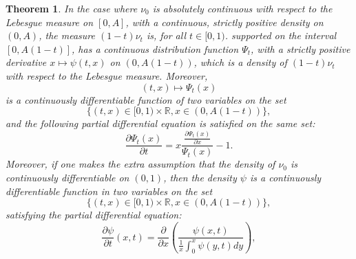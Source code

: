 \documentclass[11pt]{amsart}
\newtheorem{theorem}{Theorem}[section]
\newtheorem{remark}[theorem]{Remark}
\begin{document}
\begin{theorem}
In the case where 
$\nu_0$ is absolutely continuous with respect to the Lebesgue measure on $[0,A]$, 
with a continuous, strictly positive density 
on $(0,A)$, the measure 
$(1-t) \nu_t$ is, for all $t \in [0,1)$.  supported on the interval 
$[0, A(1-t)]$, has a continuous distribution 
function $\Psi_t$, with a strictly positive 
derivative $x \mapsto \psi(t,x)$
on $(0, A(1-t))$, which is a density of $(1-t) \nu_t$ with respect to the Lebesgue measure.  Moreover, 
$$(t, x) \mapsto \Psi_t(x)$$ is a continuously differentiable function of two variables on the set 
$$\{(t,x) \in [0,1) \times \mathbb{R}, 
x \in (0, A(1-t)) \},$$
and the following partial differential equation is satisfied on the same set: 
\begin{equation}
\label{equationPsixt}
\frac{\partial \Psi_t (x)}{\partial t} 
= x \frac{\frac{\partial \Psi_t (x)}{\partial x}  } {\Psi_t(x)} - 1. 
\end{equation}
Moreover, if one makes the extra assumption 
that the density of $\nu_0$ is continuously differentiable on $(0,1)$, then the 
density $\psi$ is a continuously 
differentiable function in two variables on 
the set 
$$\{(t,x) \in [0,1) \times \mathbb{R}, 
x \in (0, A(1-t)) \},$$
satisfying the partial differential equation: 
\begin{equation}
\frac{\partial \psi}{\partial t}(x,t) 
= \frac{\partial}{\partial x} \left( 
\frac{\psi(x,t)}{\frac{1}{x} \int_0^x \psi(y,t) dy} 
\right),
\label{PDErotationalmaintheorem}
\end{equation}

















\end{theorem}

\end{document}
